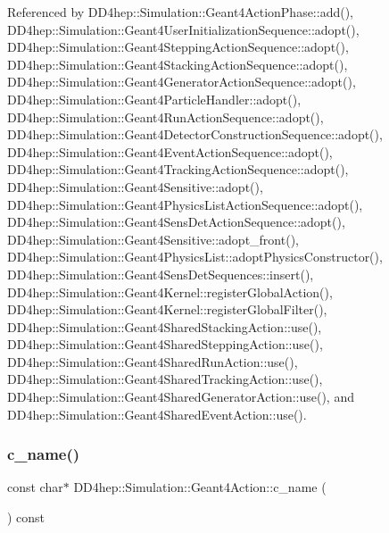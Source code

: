 Referenced by D\+D4hep\+::\+Simulation\+::\+Geant4\+Action\+Phase\+::add(), D\+D4hep\+::\+Simulation\+::\+Geant4\+User\+Initialization\+Sequence\+::adopt(), D\+D4hep\+::\+Simulation\+::\+Geant4\+Stepping\+Action\+Sequence\+::adopt(), D\+D4hep\+::\+Simulation\+::\+Geant4\+Stacking\+Action\+Sequence\+::adopt(), D\+D4hep\+::\+Simulation\+::\+Geant4\+Generator\+Action\+Sequence\+::adopt(), D\+D4hep\+::\+Simulation\+::\+Geant4\+Particle\+Handler\+::adopt(), D\+D4hep\+::\+Simulation\+::\+Geant4\+Run\+Action\+Sequence\+::adopt(), D\+D4hep\+::\+Simulation\+::\+Geant4\+Detector\+Construction\+Sequence\+::adopt(), D\+D4hep\+::\+Simulation\+::\+Geant4\+Event\+Action\+Sequence\+::adopt(), D\+D4hep\+::\+Simulation\+::\+Geant4\+Tracking\+Action\+Sequence\+::adopt(), D\+D4hep\+::\+Simulation\+::\+Geant4\+Sensitive\+::adopt(), D\+D4hep\+::\+Simulation\+::\+Geant4\+Physics\+List\+Action\+Sequence\+::adopt(), D\+D4hep\+::\+Simulation\+::\+Geant4\+Sens\+Det\+Action\+Sequence\+::adopt(), D\+D4hep\+::\+Simulation\+::\+Geant4\+Sensitive\+::adopt\+\_\+front(), D\+D4hep\+::\+Simulation\+::\+Geant4\+Physics\+List\+::adopt\+Physics\+Constructor(), D\+D4hep\+::\+Simulation\+::\+Geant4\+Sens\+Det\+Sequences\+::insert(), D\+D4hep\+::\+Simulation\+::\+Geant4\+Kernel\+::register\+Global\+Action(), D\+D4hep\+::\+Simulation\+::\+Geant4\+Kernel\+::register\+Global\+Filter(), D\+D4hep\+::\+Simulation\+::\+Geant4\+Shared\+Stacking\+Action\+::use(), D\+D4hep\+::\+Simulation\+::\+Geant4\+Shared\+Stepping\+Action\+::use(), D\+D4hep\+::\+Simulation\+::\+Geant4\+Shared\+Run\+Action\+::use(), D\+D4hep\+::\+Simulation\+::\+Geant4\+Shared\+Tracking\+Action\+::use(), D\+D4hep\+::\+Simulation\+::\+Geant4\+Shared\+Generator\+Action\+::use(), and D\+D4hep\+::\+Simulation\+::\+Geant4\+Shared\+Event\+Action\+::use().

\hypertarget{class_d_d4hep_1_1_simulation_1_1_geant4_action_a7e0ce5a638e716e0e607536a73a85cbf}{}\label{class_d_d4hep_1_1_simulation_1_1_geant4_action_a7e0ce5a638e716e0e607536a73a85cbf} 
\subsubsection{\texorpdfstring{c\+\_\+name()}{c\_name()}}
{\footnotesize\ttfamily const char$\ast$ D\+D4hep\+::\+Simulation\+::\+Geant4\+Action\+::c\+\_\+name (\begin{DoxyParamCaption}{ }\end{DoxyParamCaption}) const\hspace{0.3cm}{\ttfamily [inline]}}




